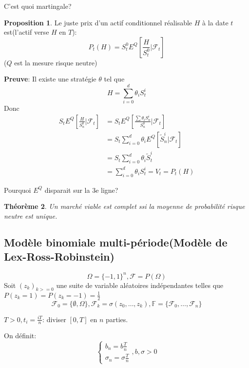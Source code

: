 \documentclass{article}
\theoremstyle{plain}
\newtheorem{thm}{Th\'eor\`eme}[section]
\theoremstyle{definition}
\newtheorem{propos}[thm]{Proposition}
\begin{document}
{\color{red} C'est quoi martingale?}

\begin{propos}
	Le juste prix d'un actif conditionnel r\'ealisable $H$ \`a la date $t$ est(l'actif verse $H$ en $T$):
\begin{equation}
P_t(H)=S_t^0 E^Q[\frac{H}{S^0_t}|\mathcal{F}_t]
\end{equation}
($Q$ est la mesure risque neutre)
\end{propos}

\textbf{Preuve}:
Il existe une strat\'egie $\theta$ tel que 
\begin{equation}
H=\sum_{i=0}^d \theta_i S_t^i
\end{equation}
Donc
\begin{equation}
\begin{split}
S_tE^Q[\frac{H}{S_n^0}|\mathcal{F}_t]&=S_tE^Q[\frac{\sum\theta_i S_n^i}{S_n^0}|\mathcal{F}_t]\\
&=S_t\sum_{i=0}^d\theta_i E^Q[\tilde{S}_n^i|\mathcal{F}_t]\\
&=S_t\sum_{i=0}^d\theta_i\tilde{S}_t^i\\
&=\sum_{i=0}^d\theta_i S_t^i=V_t=P_t(H)
\end{split}
\end{equation}

{\color{red} Pourquoi $E^Q$ disparait sur la 3e ligne?}

\begin{thm}
	Un march\'e viable est complet ssi la moyenne de probabilit\'e risque neutre est unique.
\end{thm}


\subsection{Mod\`ele binomiale multi-p\'eriode(Mod\`ele de Lex-Ross-Robinstein)}
\begin{equation}
\Omega=\{-1,1\}^n,\mathcal{F}=P(\Omega)
\end{equation}
Soit $(z_k)_{k>=0}$ une suite de variable al\'eatoires ind\'ependantes telles que $P(z_k=1)=P(z_k=-1)=\frac{1}{2}$
\begin{equation}
\mathcal{F}_0=\{\emptyset,\Omega\},\mathcal{F}_k=\sigma(z_0,\ldots,z_k),\mathbb{F}=\{\mathcal{F}_0,\ldots,\mathcal{F}_n\}
\end{equation}

$T>0, t_i=\frac{iT}{n}$: diviser $[0,T]$ en $n$ parties.

On d\'efinit:
\begin{equation}
\left\{\begin{array}{rcl}
b_n=b\frac{T}{n}\\
\sigma_n=\sigma\frac{T}{n}
\end{array}\right.
,b,\sigma>0
\end{equation}
\end{document}
